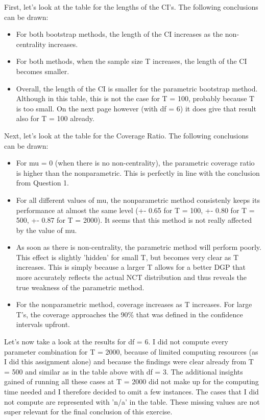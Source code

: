 \documentclass[12pt]{article}
\begin{document}
First, let's look at the table for the lengths of the CI's. The following conclusions can be drawn:
\begin{itemize}
  \item For both bootstrap methods, the length of the CI increases as the non-centrality increases.
  \item For both methods, when the sample size T increases, the length of the CI becomes smaller.
  \item Overall, the length of the CI is smaller for the parametric bootstrap method. Although in this table, this is not the case for T = 100, probably because T is too small. On the next page however (with df = 6) it does give that result also for T = 100 already.\newline
\end{itemize}


Next, let's look at the table for the Coverage Ratio. The following conclusions can be drawn:
\begin{itemize}
  \item For mu = 0 (when there is no non-centrality), the parametric coverage ratio is higher than the nonparametric. This is perfectly in line with the conclusion from Question 1.
  \item For all different values of mu, the nonparametric method consistenly keeps its performance at almost the same level (+- 0.65 for T = 100, +- 0.80 for T = 500, +- 0.87 for T = 2000). It seems that this method is not really affected by the value of mu.
  \item As soon as there is non-centrality, the parametric method will perform poorly. This effect is slightly 'hidden' for small T, but becomes very clear as T increases. This is simply because a larger T allows for a better DGP that more accurately reflects the actual NCT distribution and thus reveals the true weakness of the parametric method.
  \item For the nonparametric method, coverage increases as T increases. For large T's, the coverage approaches the 90\% that was defined in the confidence intervals upfront.
\end{itemize}

\newpage
Let's now take a look at the results for df = 6. I did not compute every parameter combination for T = 2000, because of limited computing resources (as I did this assignment alone) and because the findings were clear already from T = 500 and similar as in the table above with df = 3. The additional insights gained of running all these cases at T = 2000 did not make up for the computing time needed and I therefore decided to omit a few instances. The cases that I did not compute are represented with 'n/a' in the table. These missing values are not super relevant for the final conclusion of this exercise.
\end{document}
